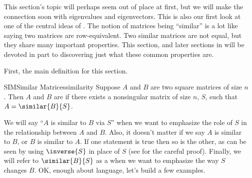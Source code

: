 %
This section's topic will perhaps seem out of place at first, but we will make the connection soon with eigenvalues and eigenvectors.  This is also our first look at one of the central ideas of .
%
%
The notion of matrices being ``similar'' is a lot like saying two matrices are row-equivalent.  Two similar matrices are not equal, but they share many important properties.  This section, and later sections in  will be devoted in part to discovering just what these common properties are.\par
%
First, the main definition for this section.
%
\begin{definition}{SIM}{Similar Matrices}{similarity}
Suppose $A$ and $B$ are two square matrices of size $n$.  Then $A$ and $B$ are  if there exists a nonsingular matrix of size $n$, $S$, such that $A=\similar{B}{S}$.
\end{definition}
%
We will say ``$A$ is similar to $B$ via $S$'' when we want to emphasize the role of $S$ in the relationship between $A$ and $B$.  Also, it doesn't matter if we say $A$ is similar to $B$, or $B$ is similar to $A$.  If one statement is true then so is the other, as can be seen by using $\inverse{S}$ in place of $S$ (see  for the careful proof).    Finally, we will refer to $\similar{B}{S}$ as a  when we want to emphasize the way $S$ changes $B$.  OK, enough about language, let's build a few examples.
%
%
